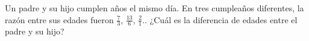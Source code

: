 Un padre y su hijo cumplen años el mismo día. En tres cumpleaños diferentes, la razón entre sus edades fueron $\frac 73$, $\frac{13}{6}$, $\frac 21$.. ¿Cuál es la diferencia de edades entre el padre y su hijo?
